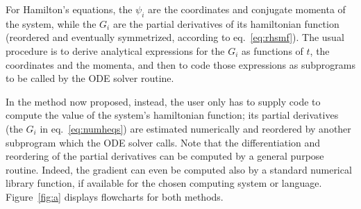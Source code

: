\documentclass{iopart}
\begin{document}
For Hamilton's equations, the $\psi_i$ are the coordinates and conjugate momenta
of the system, while the $G_i$ are the partial derivatives of its hamiltonian
function (reordered and eventually symmetrized, according to
eq.~\ref{eq:rhsmf}). The usual procedure is to derive analytical expressions
for the $G_i$ as functions of $t$, the coordinates and the momenta, and then to
code those expressions as subprograms to be called by the ODE solver routine.

In the method now proposed, instead, the user only has to supply code to
compute the value of the system's hamiltonian function; its partial derivatives
(the $G_i$ in eq.~\eqref{eq:numheqs}) are estimated numerically and reordered by
another subprogram which the ODE solver calls. Note that the differentiation and
reordering of the partial derivatives can be computed by a general purpose
routine. Indeed, the gradient can even be computed also by a standard numerical
library function, if available for the chosen computing system or language.
Figure~\ref{fig:a} displays flowcharts for both methods.
\end{document}
